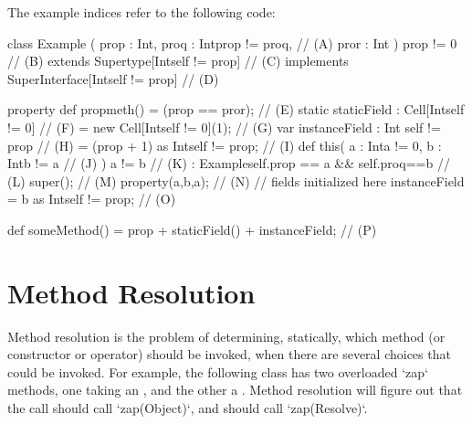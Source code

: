 The example indices refer to the following code:
\begin{xten}
class Example (
   prop : Int,
   proq : Int{prop != proq},                    // (A)
   pror : Int
   )
   {prop != 0}                                  // (B)
   extends Supertype[Int{self != prop}]         // (C)
   implements SuperInterface[Int{self != prop}] // (D)
{
   property def propmeth() = (prop == pror);    // (E)
   static staticField
      : Cell[Int{self != 0}]                    // (F)
      = new Cell[Int{self != 0}](1);            // (G)
   var instanceField
      : Int {self != prop}                      // (H)
      = (prop + 1) as Int{self != prop};        // (I)
   def this(
      a : Int{a != 0},
      b : Int{b != a}                           // (J)
      )
      {a != b}                                  // (K)
      : Example{self.prop == a && self.proq==b} // (L)
   {
      super();                                  // (M)
      property(a,b,a);                          // (N)
      // fields initialized here
      instanceField = b as Int{self != prop};   // (O)
   }

   def someMethod() =
        prop + staticField() + instanceField;   // (P)
}
\end{xten}
%

\section{Method Resolution}
\label{sect:MethodResolution}

Method resolution is the problem of determining, statically, which method (or
constructor or operator)
should be invoked, when there are several choices that could be invoked.  For
example, the following class has two overloaded \xcd`zap` methods, one taking
an , and the other a .  Method resolution will figure
out that the call  should call \xcd`zap(Object)`, and
 should call \xcd`zap(Resolve)`.  

